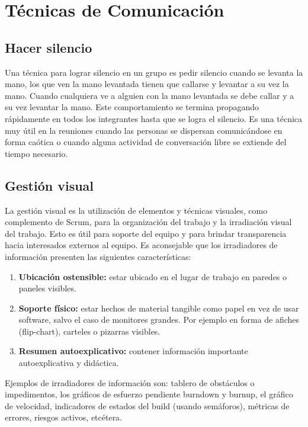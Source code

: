 \newpage
\section{Técnicas de Comunicación}

\subsection{Hacer silencio}

Una técnica para lograr silencio en un grupo es pedir silencio cuando se levanta la mano, los que ven la mano levantada tienen que callarse y levantar a su vez la mano. Cuando cualquiera ve a alguien con la mano levantada se debe callar y a su vez levantar la mano. Este comportamiento se termina propagando rápidamente en todos los integrantes hasta que se logra el silencio. Es una técnica muy útil en la reuniones cuando las personas se dispersan comunicándose en forma caótica o cuando alguna actividad de conversación libre se extiende del tiempo necesario.


\subsection{Gestión visual}

La gestión visual es la utilización de elementos y técnicas visuales, como complemento de Scrum, para la organización del trabajo y la irradiación visual del trabajo. Esto es útil para soporte del equipo y para brindar transparencia hacia interesados externos al equipo.
Es aconsejable que los irradiadores de información presenten las siguientes características:

\begin{enumerate}

\item \textbf{Ubicación ostensible:} estar ubicado en el lugar de trabajo en paredes o paneles visibles.

\item \textbf{Soporte físico:} estar hechos de material tangible como papel en vez de usar software, salvo el caso de monitores grandes. Por ejemplo en forma de afiches (flip-chart), carteles o pizarras visibles.

\item \textbf{Resumen autoexplicativo:} contener información importante autoexplicativa y didáctica.

\end{enumerate}

Ejemplos de irradiadores de información son: tablero de obstáculos o impedimentos, los gráficos de esfuerzo pendiente burndown y burnup, el gráfico de velocidad, indicadores de estados del build (usando semáforos), métricas de errores, riesgos activos, etcétera.

